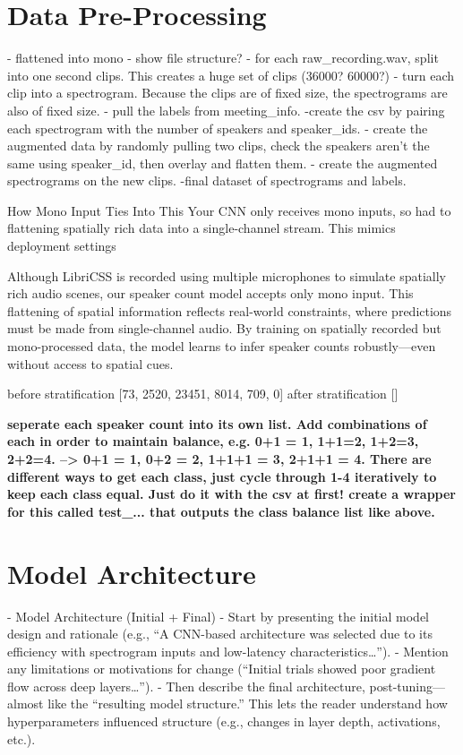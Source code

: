 \section{Data Pre-Processing}
- flattened into mono
- show file structure?
- for each raw_recording.wav, split into one second clips. This creates a huge set of clips (36000? 60000?)
- turn each clip into a spectrogram. Because the clips are of fixed size, the spectrograms are also of fixed size.
- pull the labels from meeting_info.
-create the csv by pairing each spectrogram with the number of speakers and speaker_ids.
- create the augmented data by randomly pulling two clips, check the speakers aren't the same using speaker_id, then overlay and flatten them.
- create the augmented spectrograms on the new clips.
-final dataset of spectrograms and labels.



How Mono Input Ties Into This
Your CNN only receives mono inputs, so had to flattening spatially rich data into a single-channel stream. This mimics deployment settings

Although LibriCSS is recorded using multiple microphones to simulate spatially rich audio scenes, our speaker count model accepts only mono input. This flattening of spatial information reflects real-world constraints, where predictions must be made from single-channel audio. By training on spatially recorded but mono-processed data, the model learns to infer speaker counts robustly—even without access to spatial cues.



before stratification [73, 2520, 23451, 8014, 709, 0]
after stratification []


\textbf{seperate each speaker count into its own list. Add combinations of each in order to maintain balance, e.g. 0+1 = 1, 1+1=2, 1+2=3, 2+2=4. --> 0+1 = 1, 0+2 = 2, 1+1+1 = 3, 2+1+1 = 4. There are different ways to get each class, just cycle through 1-4 iteratively to keep each class equal. Just do it with the csv at first! create a wrapper for this called test_... that outputs the class balance list like above.}

\section{Model Architecture}
- Model Architecture (Initial + Final)
- Start by presenting the initial model design and rationale (e.g., “A CNN-based architecture was selected due to its efficiency with spectrogram inputs and low-latency characteristics…”).
- Mention any limitations or motivations for change (“Initial trials showed poor gradient flow across deep layers…”).
- Then describe the final architecture, post-tuning—almost like the “resulting model structure.”
This lets the reader understand how hyperparameters influenced structure (e.g., changes in layer depth, activations, etc.).

